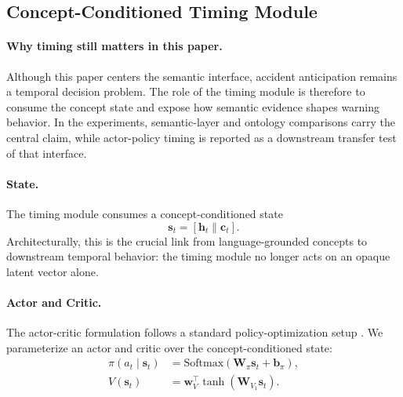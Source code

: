 \subsection{Concept-Conditioned Timing Module}

\paragraph{Why timing still matters in this paper.}
Although this paper centers the semantic interface, accident
anticipation remains a temporal decision problem. The role of the timing module
is therefore to consume the concept state and expose how semantic evidence
shapes warning behavior. In the experiments, semantic-layer and ontology
comparisons carry the central claim, while actor-policy timing is reported as a
downstream transfer test of that interface.

\paragraph{State.}
The timing module consumes a concept-conditioned state
\begin{equation}
  \mathbf{s}_t = [\mathbf{h}_t \| \mathbf{c}_t].
  \label{eq:state}
\end{equation}
Architecturally, this is the crucial link from language-grounded concepts to
downstream temporal behavior: the timing module no longer acts on an opaque
latent vector alone.

\paragraph{Actor and Critic.}
The actor-critic formulation follows a standard policy-optimization setup
\citep{konda1999actor,sutton2018reinforcement}.
We parameterize an actor and critic over the concept-conditioned state:
\begin{align}
  \pi(a_t \mid \mathbf{s}_t)
    &= \mathrm{Softmax}(\mathbf{W}_\pi \mathbf{s}_t + \mathbf{b}_\pi), \\
  V(\mathbf{s}_t)
    &= \mathbf{w}_V^\top \tanh(\mathbf{W}_{V_1}\mathbf{s}_t).
\end{align}

